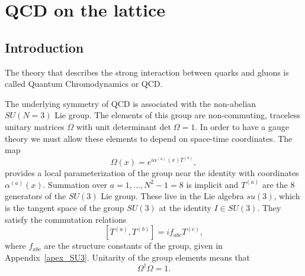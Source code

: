 \chapter{QCD on the lattice}%


\label{ch_foundation}


\section{Introduction}
\label{ch_foundation:sec:general}

The theory that describes the strong interaction between quarks and gluons is called Quantum Chromodynamics or QCD. 

The underlying symmetry of QCD is associated with the non-abelian $SU(N=3)$ Lie group. The elements of this group are non-commuting, traceless unitary matrices $\Omega$ with unit determinant $\textrm{det}\;\Omega=1$. In order to have a gauge theory we must allow these elements to depend on space-time coordinates. The map
\begin{equation}
\Omega(x)=e^{i\alpha^{(a)}(x)T^{(a)}},
\end{equation}
provides a local parameterization of the group near the identity with coordinates $\alpha^{(a)}(x)$. Summation over $a=1,...,N^2-1=8$ is implicit and $T^{(a)}$ are the 8 generators of the $SU(3)$ Lie group. These live in the Lie algebra $su(3)$, which is the tangent space of the group $SU(3)$ at the identity $I\in SU(3)$. They satisfy the commutation relations
\begin{equation}
\left[T^{(a)}, T^{(b)}\right]=if_{abc}T^{(c)},
\end{equation}
where $f_{abc}$ are the structure constants of the group, given in Appendix~\ref{apex_SU3}. Unitarity of the group elements means that
\begin{equation}
\Omega^{\dagger}\Omega=1.
\end{equation}

